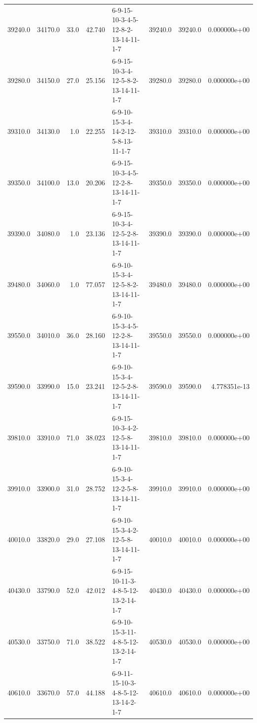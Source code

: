 \begin{tabular}{rrrrlrrr}
 39240.0 &  34170.0 &           33.0 &             42.740 &  6-9-15-10-3-4-5-12-8-2-13-14-11-1-7 &       39240.0 &         39240.0 &  0.000000e+00 \\
 39280.0 &  34150.0 &           27.0 &             25.156 &  6-9-15-10-3-4-12-5-8-2-13-14-11-1-7 &       39280.0 &         39280.0 &  0.000000e+00 \\
 39310.0 &  34130.0 &            1.0 &             22.255 &  6-9-10-15-3-4-14-2-12-5-8-13-11-1-7 &       39310.0 &         39310.0 &  0.000000e+00 \\
 39350.0 &  34100.0 &           13.0 &             20.206 &  6-9-15-10-3-4-5-12-2-8-13-14-11-1-7 &       39350.0 &         39350.0 &  0.000000e+00 \\
 39390.0 &  34080.0 &            1.0 &             23.136 &  6-9-15-10-3-4-12-5-2-8-13-14-11-1-7 &       39390.0 &         39390.0 &  0.000000e+00 \\
 39480.0 &  34060.0 &            1.0 &             77.057 &  6-9-10-15-3-4-12-5-8-2-13-14-11-1-7 &       39480.0 &         39480.0 &  0.000000e+00 \\
 39550.0 &  34010.0 &           36.0 &             28.160 &  6-9-10-15-3-4-5-12-2-8-13-14-11-1-7 &       39550.0 &         39550.0 &  0.000000e+00 \\
 39590.0 &  33990.0 &           15.0 &             23.241 &  6-9-10-15-3-4-12-5-2-8-13-14-11-1-7 &       39590.0 &         39590.0 &  4.778351e-13 \\
 39810.0 &  33910.0 &           71.0 &             38.023 &  6-9-15-10-3-4-2-12-5-8-13-14-11-1-7 &       39810.0 &         39810.0 &  0.000000e+00 \\
 39910.0 &  33900.0 &           31.0 &             28.752 &  6-9-10-15-3-4-12-2-5-8-13-14-11-1-7 &       39910.0 &         39910.0 &  0.000000e+00 \\
 40010.0 &  33820.0 &           29.0 &             27.108 &  6-9-10-15-3-4-2-12-5-8-13-14-11-1-7 &       40010.0 &         40010.0 &  0.000000e+00 \\
 40430.0 &  33790.0 &           52.0 &             42.012 &  6-9-15-10-11-3-4-8-5-12-13-2-14-1-7 &       40430.0 &         40430.0 &  0.000000e+00 \\
 40530.0 &  33750.0 &           71.0 &             38.522 &  6-9-10-15-3-11-4-8-5-12-13-2-14-1-7 &       40530.0 &         40530.0 &  0.000000e+00 \\
 40610.0 &  33670.0 &           57.0 &             44.188 &  6-9-11-15-10-3-4-8-5-12-13-14-2-1-7 &       40610.0 &         40610.0 &  0.000000e+00 \\

\end{tabular}
